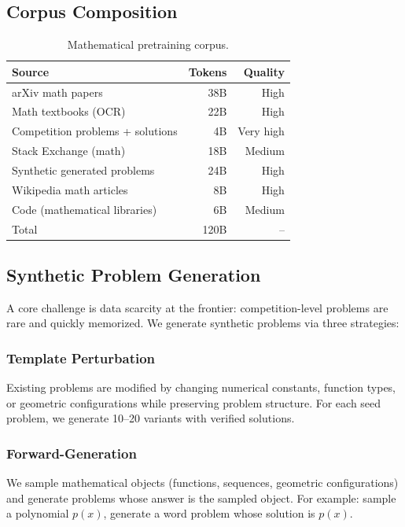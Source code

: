 \documentclass[11pt,a4paper]{article}
\begin{document}
\subsection{Corpus Composition}

\begin{table}[H]
\centering
\begin{tabular}{lrr}
\toprule
\textbf{Source} & \textbf{Tokens} & \textbf{Quality} \\
\midrule
arXiv math papers & 38B & High \\
Math textbooks (OCR) & 22B & High \\
Competition problems + solutions & 4B & Very high \\
Stack Exchange (math) & 18B & Medium \\
Synthetic generated problems & 24B & High \\
Wikipedia math articles & 8B & High \\
Code (mathematical libraries) & 6B & Medium \\
\midrule
Total & 120B & -- \\
\bottomrule
\end{tabular}
\caption{Mathematical pretraining corpus.}
\end{table}

\subsection{Synthetic Problem Generation}

A core challenge is data scarcity at the frontier: competition-level problems are
rare and quickly memorized. We generate synthetic problems via three strategies:

\subsubsection{Template Perturbation}

Existing problems are modified by changing numerical constants, function types, or
geometric configurations while preserving problem structure. For each seed problem,
we generate 10--20 variants with verified solutions.

\subsubsection{Forward-Generation}

We sample mathematical objects (functions, sequences, geometric configurations) and
generate problems whose answer is the sampled object. For example: sample a polynomial
$p(x)$, generate a word problem whose solution is $p(x)$.
\end{document}
